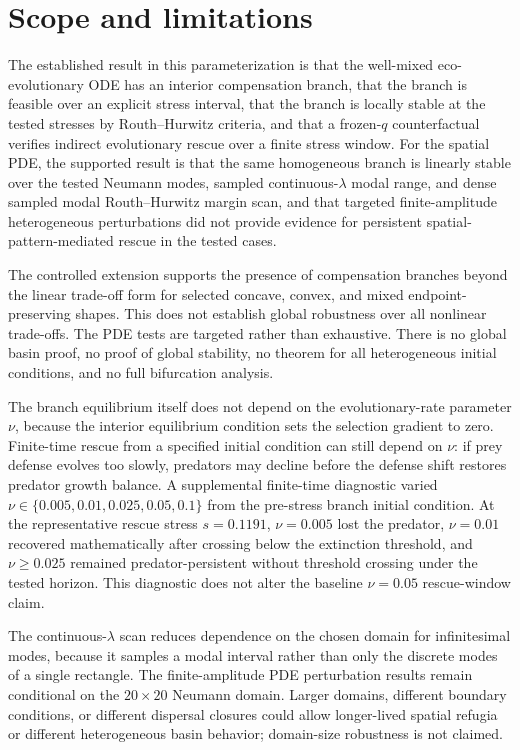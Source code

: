 \documentclass[11pt]{article}
\begin{document}
\FloatBarrier

\section{Scope and limitations}

The established result in this parameterization is that the well-mixed eco-evolutionary ODE has an interior compensation branch, that the branch is feasible over an explicit stress interval, that the branch is locally stable at the tested stresses by Routh--Hurwitz criteria, and that a frozen-\(q\) counterfactual verifies indirect evolutionary rescue over a finite stress window. For the spatial PDE, the supported result is that the same homogeneous branch is linearly stable over the tested Neumann modes, sampled continuous-\(\lambda\) modal range, and dense sampled modal Routh--Hurwitz margin scan, and that targeted finite-amplitude heterogeneous perturbations did not provide evidence for persistent spatial-pattern-mediated rescue in the tested cases.

The controlled extension supports the presence of compensation branches beyond the linear trade-off form for selected concave, convex, and mixed endpoint-preserving shapes. This does not establish global robustness over all nonlinear trade-offs. The PDE tests are targeted rather than exhaustive. There is no global basin proof, no proof of global stability, no theorem for all heterogeneous initial conditions, and no full bifurcation analysis.

The branch equilibrium itself does not depend on the evolutionary-rate parameter \(\nu\), because the interior equilibrium condition sets the selection gradient to zero. Finite-time rescue from a specified initial condition can still depend on \(\nu\): if prey defense evolves too slowly, predators may decline before the defense shift restores predator growth balance. A supplemental finite-time diagnostic varied \(\nu\in\{0.005,0.01,0.025,0.05,0.1\}\) from the pre-stress branch initial condition. At the representative rescue stress \(s=0.1191\), \(\nu=0.005\) lost the predator, \(\nu=0.01\) recovered mathematically after crossing below the extinction threshold, and \(\nu\ge0.025\) remained predator-persistent without threshold crossing under the tested horizon. This diagnostic does not alter the baseline \(\nu=0.05\) rescue-window claim.

The continuous-\(\lambda\) scan reduces dependence on the chosen domain for infinitesimal modes, because it samples a modal interval rather than only the discrete modes of a single rectangle. The finite-amplitude PDE perturbation results remain conditional on the \(20\times20\) Neumann domain. Larger domains, different boundary conditions, or different dispersal closures could allow longer-lived spatial refugia or different heterogeneous basin behavior; domain-size robustness is not claimed.
\end{document}
